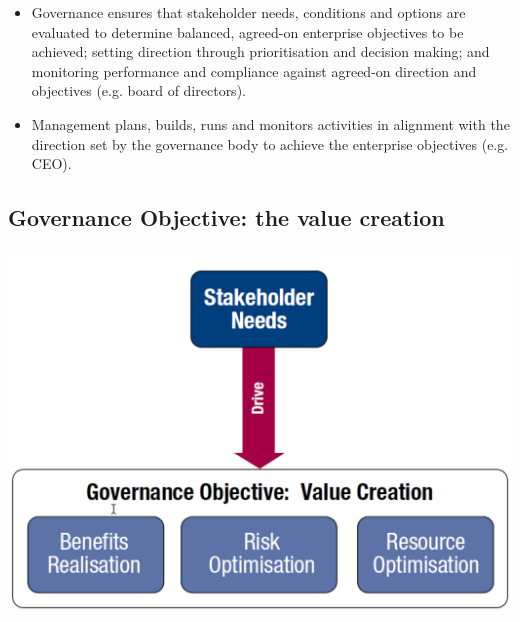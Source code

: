 \documentclass[8pt]{extarticle}
\begin{document}
\begin{multicols}{3}
\begin{itemize}
    \item Governance ensures that stakeholder needs, conditions and options
    are evaluated to determine balanced, agreed-on enterprise objectives
    to be achieved; setting direction through prioritisation and decision
    making; and monitoring performance and compliance against
    agreed-on direction and objectives (e.g. board of directors).
    \item Management plans, builds, runs and monitors activities in alignment
    with the direction set by the governance body to achieve the
    enterprise objectives (e.g. CEO).
\end{itemize}

\subsection{Governance Objective: the value creation}
\begin{center}
    \begin{minipage}{0.5\columnwidth}
        \includegraphics[width=\columnwidth]{governance-objective-value-creation.png}
    \end{minipage}
\end{center}


\end{multicols}
\end{document}
